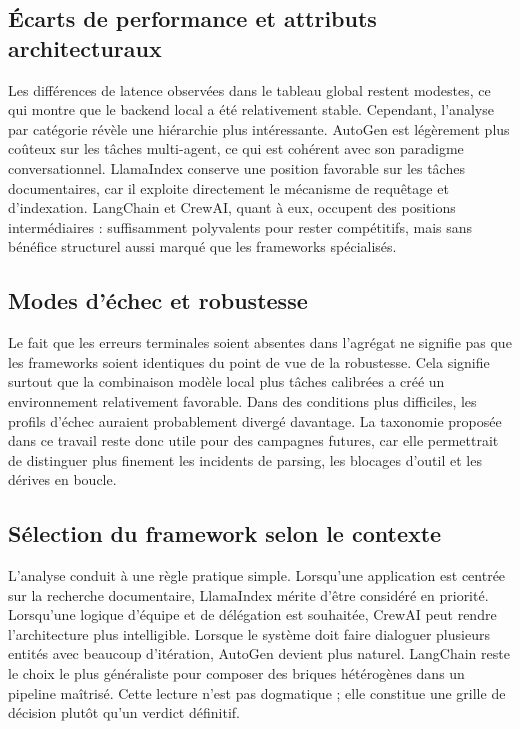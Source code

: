 \documentclass[11pt,a4paper]{article}
\begin{document}
\subsection{Écarts de performance et attributs architecturaux}
Les différences de latence observées dans le tableau global restent modestes, ce qui montre que le backend local a été relativement stable. Cependant, l'analyse par catégorie révèle une hiérarchie plus intéressante. AutoGen est légèrement plus coûteux sur les tâches multi-agent, ce qui est cohérent avec son paradigme conversationnel. LlamaIndex conserve une position favorable sur les tâches documentaires, car il exploite directement le mécanisme de requêtage et d'indexation. LangChain et CrewAI, quant à eux, occupent des positions intermédiaires : suffisamment polyvalents pour rester compétitifs, mais sans bénéfice structurel aussi marqué que les frameworks spécialisés.

\subsection{Modes d'échec et robustesse}
Le fait que les erreurs terminales soient absentes dans l'agrégat ne signifie pas que les frameworks soient identiques du point de vue de la robustesse. Cela signifie surtout que la combinaison modèle local plus tâches calibrées a créé un environnement relativement favorable. Dans des conditions plus difficiles, les profils d'échec auraient probablement divergé davantage. La taxonomie proposée dans ce travail reste donc utile pour des campagnes futures, car elle permettrait de distinguer plus finement les incidents de parsing, les blocages d'outil et les dérives en boucle.

\subsection{Sélection du framework selon le contexte}
L'analyse conduit à une règle pratique simple. Lorsqu'une application est centrée sur la recherche documentaire, LlamaIndex mérite d'être considéré en priorité. Lorsqu'une logique d'équipe et de délégation est souhaitée, CrewAI peut rendre l'architecture plus intelligible. Lorsque le système doit faire dialoguer plusieurs entités avec beaucoup d'itération, AutoGen devient plus naturel. LangChain reste le choix le plus généraliste pour composer des briques hétérogènes dans un pipeline maîtrisé. Cette lecture n'est pas dogmatique ; elle constitue une grille de décision plutôt qu'un verdict définitif.
\end{document}
